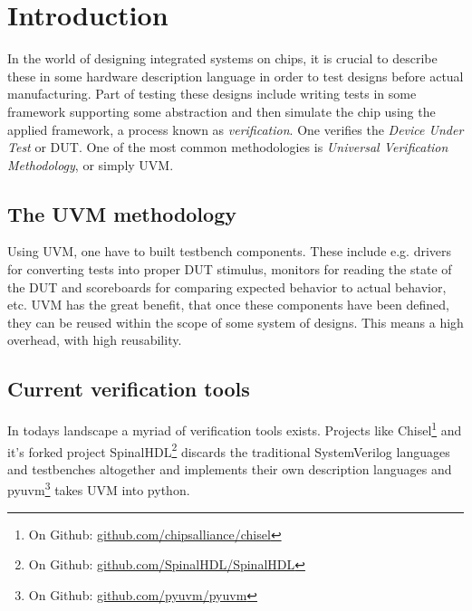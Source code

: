 \section{Introduction}\label{sec:02}
In the world of designing integrated systems on chips, it is crucial to describe these in some hardware description language in order to test designs before actual manufacturing. Part of testing these designs include writing tests in some framework supporting some abstraction and then simulate the chip using the applied framework, a process known as \emph{verification}. One verifies the \emph{Device Under Test} or DUT. One of the most common methodologies is \emph{Universal Verification Methodology}, or simply UVM.
\subsection{The UVM methodology}
Using UVM, one have to built testbench components. These include e.g. drivers for converting tests into proper DUT stimulus, monitors for reading the state of the DUT and scoreboards for comparing expected behavior to actual behavior, etc. UVM has the great benefit, that once these components have been defined, they can be reused within the scope of some system of designs. This means a high overhead, with high reusability.
\subsection{Current verification tools}
In todays landscape a myriad of verification tools exists. Projects like Chisel\footnote{On Github: \href{https://github.com/chipsalliance/chisel}{github.com/chipsalliance/chisel}} and it's forked project SpinalHDL\footnote{On Github: \href{https://github.com/SpinalHDL/SpinalHDL}{github.com/SpinalHDL/SpinalHDL}} discards the traditional SystemVerilog languages and testbenches altogether and implements their own description languages and pyuvm\footnote{On Github: \href{https://github.com/pyuvm/pyuvm}{github.com/pyuvm/pyuvm}} takes UVM into python.
\cite{reddy_formal_2024}\cite{noauthor_ieee_2024}